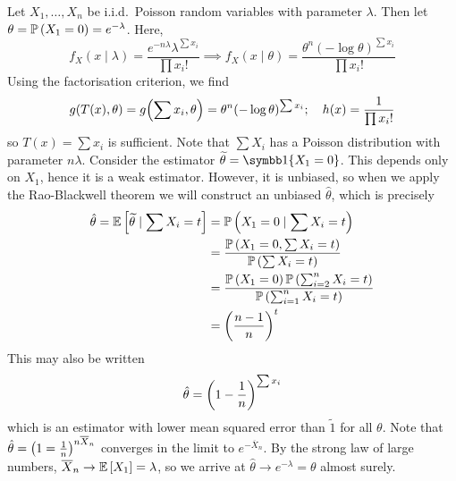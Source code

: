 \begin{example}
	Let \( X_1, \dots, X_n \) be i.i.d.\ Poisson random variables with parameter \( \lambda \).
	Then let \( \theta = \mathbb{P}\left({X_1 = 0}\right) = e^{-\lambda} \).
	Here,
	\[
		f_X(x \mid \lambda) = \frac{e^{-n \lambda} \lambda^{\sum x_i}}{\prod x_i!} \implies f_X(x \mid \theta) = \frac{\theta^n (-\log \theta)^{\sum x_i}}{\prod x_i!}
	\]
	Using the factorisation criterion, we find
	\[
		g(T(x), \theta) = g\qty(\sum x_i, \theta) = \theta^n (-\log\theta)^{\sum x_i};\quad h(x) = \frac{1}{\prod x_i!}
	\]
	so \( T(x) = \sum x_i \) is sufficient.
	Note that \( \sum X_i \) has a Poisson distribution with parameter \( n \lambda \).
	Consider the estimator \( \widetilde \theta = \symbb 1\qty{X_1 = 0} \).
	This depends only on \( X_1 \), hence it is a weak estimator.
	However, it is unbiased, so when we apply the Rao-Blackwell theorem we will construct an unbiased \( \hat \theta \), which is precisely
	\begin{align*}
		\hat \theta = \mathbb{E}\left[{\widetilde \theta \mid \sum X_i = t}\right] & = \mathbb{P}\left({X_1 = 0 \mid \sum X_i = t}\right)                                              \\
		                                                           & = \frac{\mathbb{P}\left({X_1 = 0, \sum X_i = t}\right)}{\mathbb{P}\left({\sum X_i = t}\right)}                      \\
		                                                           & = \frac{\mathbb{P}\left({X_1 = 0}\right)\mathbb{P}\left({\sum_{i=2}^n X_i = t}\right)}{\mathbb{P}\left({\sum_{i=1}^n X_i = t}\right)} \\
		                                                           & = \qty(\frac{n-1}{n})^t
	\end{align*}
	This may also be written
	\[
		\hat \theta = \qty(1 - \frac{1}{n})^{\sum x_i}
	\]
	which is an estimator with lower mean squared error than \( \widetilde 1 \) for all \( \theta \).
	Note that \( \hat \theta = \qty(1 = \frac{1}{n})^{n \overline X_n} \) converges in the limit to \( e^{-\overline X_n} \).
	By the strong law of large numbers, \( \overline X_n \to \mathbb{E}\left[{X_1}\right] = \lambda \), so we arrive at \( \hat \theta \to e^{-\lambda} = \theta \) almost surely.
\end{example}
